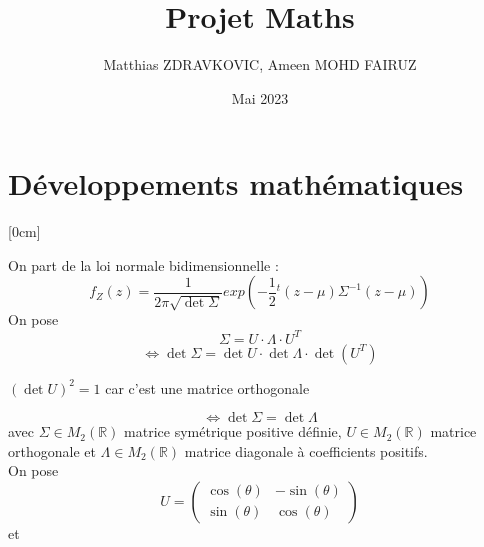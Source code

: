\documentclass{article}
\title{Projet Maths}
\author{Matthias ZDRAVKOVIC, Ameen MOHD FAIRUZ}
\date{Mai 2023}
\begin{document}
\maketitle

\section{Développements mathématiques}

\reversemarginpar{}[0cm]

On part de la loi normale bidimensionnelle :
$$f_Z(z) = \frac{1}{2\pi \sqrt{\det \Sigma}}exp(-\frac{1}{2}{}^{t}(z-\mu)\Sigma^{-1}(z-\mu))$$
On pose
$$\Sigma = U \cdot \Lambda \cdot U^T$$
$$ \Leftrightarrow \det \Sigma = \det U \cdot \det \Lambda \cdot \det (U^T) $$
\begin{center}
$(\det U)^{2}=1$ car c'est une matrice orthogonale
\end{center}
$$\Leftrightarrow \det \Sigma =\det \Lambda$$
avec $\Sigma \in M_2(\mathbb{R})$ matrice symétrique positive définie, $U \in M_2(\mathbb{R})$ matrice orthogonale et $\Lambda \in M_2(\mathbb{R})$ matrice diagonale à coefficients positifs.\\
On pose
\[
U = \begin{pmatrix}
    \cos(\theta) & -\sin(\theta) \\
    \sin(\theta) & \cos(\theta)
\end{pmatrix}
\]
et 
\end{document}
